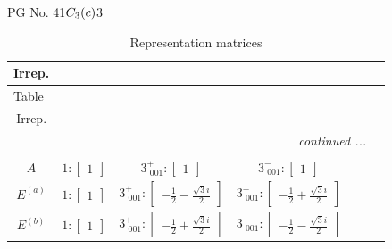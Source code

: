 \documentclass[fleqn,8pt,landscape]{jsarticle}
\begin{document}
\setcounter{MaxMatrixCols}{32}

\renewcommand{\tablename}{Table~}
\renewcommand{\figurename}{Figure~}
\begin{center}
\LARGE
PG No. 41\quad$C_{\rm 3}(c)$\quad$3$\quad[ trigonal ]
\end{center}
\renewcommand{\arraystretch}{1.2}
\begin{longtable}{ccccccc}
\caption{Representation matrices}
 \\
 \hline \hline
Irrep. &  &  &  &  &  &  \\ \hline \endfirsthead

\multicolumn{6}{l}{\tablename\ \thetable{}} \\
 \hline \hline
Irrep. &  &  &  &  &  &  \\ \hline \endhead

 \hline \hline
\multicolumn{6}{r}{\footnotesize\it continued ...} \\ \endfoot

 \hline \hline
\multicolumn{6}{r}{} \\ \endlastfoot

$ A $ & $ 1:\begin{bmatrix} 1 \end{bmatrix} $ & $ 3^{+}_{\,\,001}:\begin{bmatrix} 1 \end{bmatrix} $ & $ 3^{-}_{\,\,001}:\begin{bmatrix} 1 \end{bmatrix} $ \\ \hline
$ E^{(a)} $ & $ 1:\begin{bmatrix} 1 \end{bmatrix} $ & $ 3^{+}_{\,\,001}:\begin{bmatrix} - \frac{1}{2} - \frac{\sqrt{3} i}{2} \end{bmatrix} $ & $ 3^{-}_{\,\,001}:\begin{bmatrix} - \frac{1}{2} + \frac{\sqrt{3} i}{2} \end{bmatrix} $ \\ \hline
$ E^{(b)} $ & $ 1:\begin{bmatrix} 1 \end{bmatrix} $ & $ 3^{+}_{\,\,001}:\begin{bmatrix} - \frac{1}{2} + \frac{\sqrt{3} i}{2} \end{bmatrix} $ & $ 3^{-}_{\,\,001}:\begin{bmatrix} - \frac{1}{2} - \frac{\sqrt{3} i}{2} \end{bmatrix} $ \\
\end{longtable}
\end{document}
